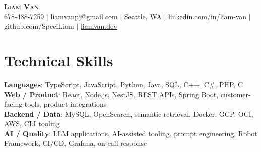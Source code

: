 \documentclass[letterpaper,11pt]{article}
\begin{document}

%
\begin{center}
    \textbf{\Huge \scshape Liam Van} \\ \vspace{1pt}
    \small 678-488-7259 $|$ \small {liamvanpj@gmail.com} $|$ Seattle, WA
 {{$|$ linkedin.com/in/liam-van} {$|$ github.com/SpeciLiam} {$|$ \href{https://liamvan.dev}{liamvan.dev}}}

\end{center}

\section{Technical Skills}
 \begin{itemize}[leftmargin=0.15in, label={}]
    \small{\item{
     \textbf{Languages}{: TypeScript, JavaScript, Python, Java, SQL, C++, C\#, PHP, C} \\
     \textbf{Web / Product}{: React, Node.js, NestJS, REST APIs, Spring Boot, customer-facing tools, product integrations} \\
     \textbf{Backend / Data}{: MySQL, OpenSearch, semantic retrieval, Docker, GCP, OCI, AWS, CLI tooling} \\
     \textbf{AI / Quality}{: LLM applications, AI-assisted tooling, prompt engineering, Robot Framework, CI/CD, Grafana, on-call response} \\
    }}
 \end{itemize}
%

\end{document}
